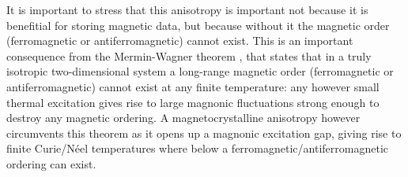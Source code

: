 It is important to stress that this anisotropy is important not because it is benefitial for storing magnetic data, but because without it the magnetic order (ferromagnetic or antiferromagnetic) cannot exist. This is an important consequence from the Mermin-Wagner theorem \cite{mermin_absence_1966}, that states that in a truly isotropic two-dimensional system a long-range magnetic order (ferromagnetic or antiferromagnetic) cannot exist at any finite temperature: any however small thermal excitation gives rise to large magnonic fluctuations strong enough to destroy any magnetic ordering. A magnetocrystalline anisotropy however circumvents this theorem as it opens up a magnonic excitation gap, giving rise to finite Curie/N\'eel temperatures where below a ferromagnetic/antiferromagnetic ordering can exist. 



